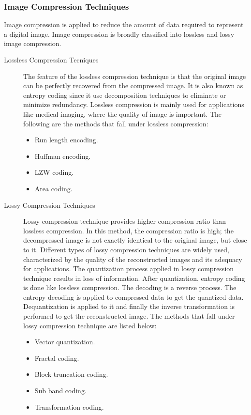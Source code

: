 \subsubsection{Image Compression Techniques}
Image compression is applied to reduce the amount of data required to represent a digital image. Image compression is broadly classified into lossless and lossy image compression\cite{Chandran:2012}.
\begin{description}
\item[Lossless Compression Tecniques] The feature of the lossless compression technique is that the original image can be perfectly recovered from the compressed image. It is also known as entropy coding since it use decomposition techniques to eliminate or minimize redundancy\cite{Woods:2008}. Lossless compression is mainly used for applications like medical imaging, where the quality of image is important. The following are the methods that fall under lossless compression:
	\begin{itemize}
	\item Run length encoding.
	\item Huffman encoding.
	\item LZW coding.
	\item Area coding.
	\end{itemize}
\item[Lossy Compression Techniques] Lossy compression technique provides higher compression ratio than lossless compression. In this method, the compression ratio is high; the decompressed image is not exactly identical to the original image, but close to it. Different types of lossy compression techniques are widely used, characterized by the quality of the reconstructed images and its adequacy for applications. The quantization process applied in lossy compression technique results in loss of information. After quantization, entropy coding is done like lossless compression. The decoding is a reverse process. The entropy decoding is applied to compressed data to get the quantized data. Dequantization is applied to it and finally the inverse transformation is performed to get the reconstructed image. The methods that fall under lossy compression technique are listed below:
	\begin{itemize}
	\item Vector quantization.
	\item Fractal coding.
	\item Block truncation coding.
	\item Sub band coding.
	\item Transformation coding.
	\end{itemize}
\end{description}

